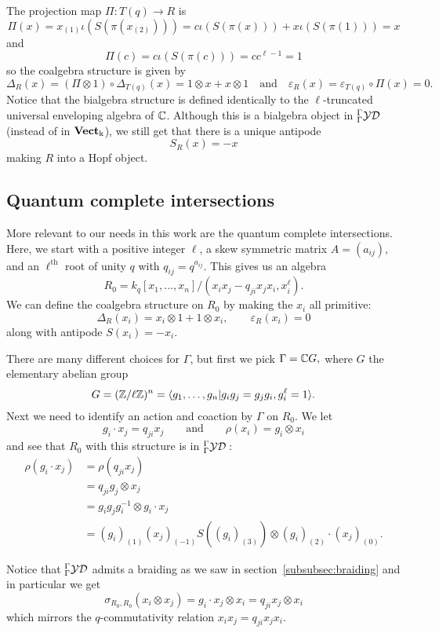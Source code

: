 \documentclass [11pt, proquest] {uwthesis}[2020/02/24]
\begin{document}
    The projection map $\Pi:T(q)\to R$ is
    \[\Pi(x)=x_{(1)}\iota(S(\pi(x_{(2)})))=c\iota(S(\pi(x)))+x\iota(S(\pi(1)))=x\]
    and
    \[\Pi(c)=c\iota(S(\pi(c)))=cc^{\ell-1}=1\]
    so the coalgebra structure is given by
    \[\Delta_R(x)=(\Pi\otimes 1)\circ\Delta_{T(q)}(x)=1\otimes x+x\otimes 1\quad\text{and}\quad\varepsilon_R(x)=\varepsilon_{T(q)}\circ\Pi(x)=0.\]
    Notice that the bialgebra structure is defined identically to the $\ell$-truncated universal enveloping algebra of $\mathbb{C}$. Although this is a bialgebra object in ${^\Gamma_\Gamma\mathcal{YD}}$ (instead of in $\operatorname{\mathbf{Vect}_k}$), we still get that there is a unique antipode
    \[S_R(x)=-x\]
    making $R$ into a Hopf object.

\subsection{Quantum complete intersections}\label{subsec:construction-bqcis}
    More relevant to our needs in this work are the quantum complete intersections. Here, we start with a positive integer $\ell$, a skew symmetric matrix $A=(a_{ij}),$ and an $\ell^\text{th}$ root of unity $q$ with $q_{ij}=q^{a_{ij}}.$ This gives us an algebra
    \[R_0=k_q[x_1,\dots,x_n]/(x_ix_j-q_{ji}x_jx_i, x_i^\ell).\]
    We can define the coalgebra structure on $R_0$ by making the $x_i$ all primitive:
    \[\Delta_R(x_i)=x_i\otimes 1+1\otimes x_i,\qquad \varepsilon_R(x_i)=0\]
    along with antipode $S(x_i)=-x_i.$
    
    There are many different choices for $\Gamma$, but first we pick $\Gamma=\mathbb{C} G,$ where $G$ the elementary abelian group
    \[G=(\mathbb{Z}/\ell\mathbb{Z})^n=\langle g_1,\dots,g_n|g_ig_j=g_jg_i, g_i^\ell=1\rangle.\]
    Next we need to identify an action and coaction by $\Gamma$ on $R_0$. We let
    \[g_i\cdot x_j=q_{ji}x_j\qquad\text{and}\qquad \rho(x_i)=g_i\otimes x_i\]
    and see that $R_0$ with this structure is in ${^\Gamma_\Gamma\mathcal{YD}}:$
    \begin{align*}
        \rho(g_i\cdot x_j)&=\rho(q_{ji}x_j)\\
        &=q_{ji}g_j\otimes x_j\\
        &=g_ig_jg_i^{-1}\otimes g_i\cdot x_j\\
        &=(g_i)_{(1)}(x_j)_{(-1)}S((g_i)_{(3)})\otimes (g_i)_{(2)}\cdot (x_j)_{(0)}.
    \end{align*}
    
    Notice that ${^\Gamma_\Gamma\mathcal{YD}}$ admits a braiding as we saw in section~\ref{subsubsec:braiding} and in particular we get
    \[\sigma_{R_0,R_0}(x_i\otimes x_j)=g_i\cdot x_j\otimes x_i=q_{ji}x_j\otimes x_i\]
    which mirrors the $q$-commutativity relation $x_ix_j=q_{ji}x_jx_i.$
    
\end{document}
